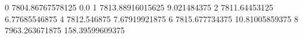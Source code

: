 0 7804.86767578125 0.0
1 7813.88916015625 9.021484375
2 7811.64453125 6.77685546875
4 7812.546875 7.67919921875
6 7815.677734375 10.81005859375
8 7963.263671875 158.39599609375

